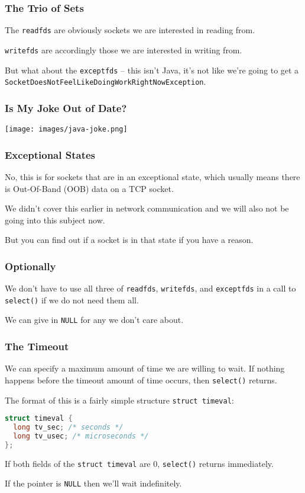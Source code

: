 \begin{frame}
	\frametitle{The Trio of Sets}

	The \texttt{readfds} are obviously sockets we are interested in reading from.

	\texttt{writefds} are accordingly those we are interested in writing from.

	But what about the \texttt{exceptfds} -- this isn't Java, it's not like we're going to get a \texttt{SocketDoesNotFeelLikeDoingWorkRightNowException}.


\end{frame}

\begin{frame}
	\frametitle{Is My Joke Out of Date?}

	\begin{center}
		\texttt{[image: images/java-joke.png]}
	\end{center}

\end{frame}

\begin{frame}
	\frametitle{Exceptional States}

	No, this is for sockets that are in an exceptional state, which usually means there is Out-Of-Band (OOB) data on a TCP socket.

	We didn't cover this earlier in network communication and we will also not be going into this subject now.

	But you can find out if a socket is in that state if you have a reason.

\end{frame}


\begin{frame}
	\frametitle{Optionally}

	We don't have to use all three of \texttt{readfds}, \texttt{writefds}, and \texttt{exceptfds} in a call to \texttt{select()} if we do not need them all.

	We can give in \texttt{NULL} for any we don't care about.

\end{frame}


\begin{frame}[fragile]
	\frametitle{The Timeout}

	We can specify a maximum amount of time we  are willing to wait. If nothing happens before the timeout amount of time occurs, then \texttt{select()} returns.

	The format of this is a fairly simple structure \texttt{struct timeval}:

	\begin{lstlisting}[language=C]
struct timeval {
  long tv_sec; /* seconds */
  long tv_usec; /* microseconds */
};
\end{lstlisting}

	If both fields of the \texttt{struct timeval} are 0, \texttt{select()} returns immediately.

	If the pointer is \texttt{NULL} then we'll wait indefinitely.
\end{frame}


